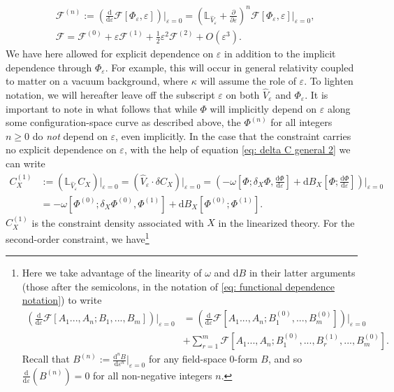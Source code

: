 \documentclass[]{jkpaper}
\theoremstyle{plain}
\theoremstyle{definition}
\newcommand{\eps}{\varepsilon}
\newcommand{\fins}{\cdot}
\newcommand{\sd}{\mathrm {d}}
\def\extd{\mathrm {d}}
\newcommand{\fd}{\delta}
\newcommand{\fL}{\mathbb{L}}
\begin{document}
\begin{equation}\label{eq:fieldExpansion}
\begin{split}
    &\mathcal{F}^{(n)}:=\left(\frac{\sd}{\sd\varepsilon}\mathcal{F}[\Phi_\varepsilon,\varepsilon]\right)\big|_{\varepsilon=0}=\left(\fL_{\hat{V}_\varepsilon}+\frac{\partial}{\partial\varepsilon}\right)^{n}\mathcal{F}[\Phi_\varepsilon,\varepsilon]\big|_{\varepsilon=0},\\
    &\mathcal{F} = \mathcal{F}^{(0)}+\varepsilon \mathcal{F}^{(1)}+\frac{1}{2}\eps^2\mathcal{F}^{(2)}+O(\varepsilon^3).
\end{split}\end{equation}
We have here allowed for explicit dependence on $\varepsilon$ in addition to the implicit dependence through $\Phi_\varepsilon$. For example, this will occur in general relativity coupled to matter on a vacuum background, where $\kappa$ will assume the role of $\varepsilon$. To lighten notation, we will hereafter leave off the subscript $\varepsilon$ on both $\hat{V}_\varepsilon$ and $\Phi_\varepsilon$.  It is important to note in what follows that while $\Phi$ will implicitly depend on $\varepsilon$ along some configuration-space curve as described above, the $\Phi^{(n)}$ for all integers $n\geq0$ do \textit{not} depend on $\varepsilon$, even implicitly.  In the case that the constraint carries no explicit dependence on $\varepsilon$, with the help of equation \eqref{eq: delta C general 2} we can write 
\begin{equation}\begin{split}\label{eq: first order constraint, general}
     C_{X}^{(1)}&:=\left(\fL_{\hat{V}_\varepsilon}C_{X}\right)\big|_{\varepsilon=0}
     =(\hat{V}_\varepsilon\fins\fd C_{X})\big|_{\varepsilon=0}
     = \left(-\omega\left[\Phi;\delta_X \Phi,\frac{\extd \Phi}{\extd \varepsilon}\right]+ \sd B_{X}\left[\Phi; \frac{\extd \Phi}{\extd \varepsilon}\right]\right)\bigg|_{\varepsilon=0}\\
     &= -\omega\left[\Phi^{(0)};\delta_X\Phi^{(0)}, \Phi^{(1)}\right]+ \sd B_{X}\left[\Phi^{(0)}; \Phi^{(1)}\right].
\end{split}\end{equation}
$C_{X}^{(1)}$ is the constraint density associated with $X$ in the linearized theory.
For the second-order constraint, we have\footnote{Here we take advantage of the linearity of $\omega$ and $\extd B$ in their latter arguments (those after the semicolons, in the notation of  \eqref{eq: functional dependence notation}) to write
\begin{equation*}\begin{split}\label{eq: useful identity}
    \left(\frac{\extd}{\extd\varepsilon}\mathcal{F}[A_1...,A_n;B_1,...,B_m]\right)\bigg|_{\varepsilon=0}
    &=
    \left(\frac{\extd}{\extd\varepsilon}\mathcal{F}[A_1...,A_n;B^{(0)}_1,...,B^{(0)}_m]\right)\big|_{\varepsilon=0}\\
    &+\sum_{r=1}^{m}\mathcal{F}\left[A_1...,A_n;B^{(0)}_1,...,B^{(1)}_r,...,B^{(0)}_m\right].
\end{split}\end{equation*}
Recall that $B^{(n)}:=\frac{\extd^n B}{\extd\varepsilon^n}\big|_{\varepsilon=0}$ for any field-space $0$-form $B$, and so $\frac{\extd}{\extd\varepsilon}(B^{(n)})=0$ for all non-negative integers $n$.}
\end{document}
